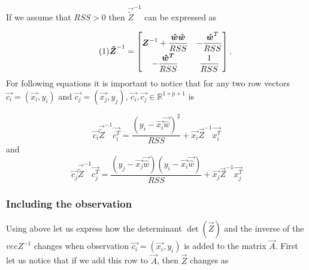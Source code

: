 If we assume that $RSS > 0$ then $\vec{\tilde{Z}}^{-1}$ can be expressed as 

\[ \numberthis
    \vec{\tilde{Z}}^{-1} = 
    \begin{bmatrix}
        \vec{Z}^{-1}+\dfrac{\vec{\hat{w}} \vec{\hat{w}}}{RSS} & - \dfrac{\vec{\hat{w}}^T}{RSS} \\[6pt]
        - \dfrac{\vec{\hat{w}^{T}}}{RSS} & \dfrac{1}{RSS}
    \end{bmatrix}.
\]
For following equations it is important to notice that for any two row vectors $\vec{c_i} = (\vec{x_i}, y_i)$  and $\vec{c_j} = (\vec{x_j}, y_j)$, $\vec{c_i}, \vec{c_j} \in \mathbb{R}^{1 \times p+1}$ is 

\begin{equation}
    \vec{c_i} \vec{\tilde{Z}}^{-1} \vec{c_i^T} = \dfrac{ ( y_i - \vec{x_i}\vec{\hat{w}} )^2 }{RSS}  + \vec{x_i}\vec{Z}^{-1}\vec{x_i^T}
\end{equation}
and
\begin{equation}
    \vec{c_j} \vec{\tilde{Z}}^{-1} \vec{c_j^T} = \dfrac{ ( y_j - \vec{x_j}\vec{\hat{w}} ) ( y_i - \vec{x_i}\vec{\hat{w}} ) }{RSS}  + \vec{x_j}\vec{Z}^{-1}\vec{x_j^T}
\end{equation}




\subsubsection*{Including the observation}

Using above let us express how the determinant $\det(\vec{Z})$ and the inverse of the $vec{Z}^{-1}$ changes when observation $\vec{c_i} = (\vec{x_i}, y_i)$ is added to the matrix $\vec{A}$. First let us notice that if we add this row to $\vec{A}$, then  $\vec{Z}$ changes as

